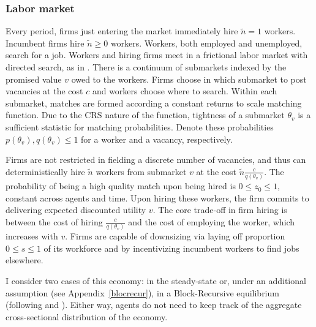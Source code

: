 \subsubsection*{Labor market}  %
Every period, firms just entering the market immediately hire $\tilde{n}=1$ workers. Incumbent firms hire $\tilde{n}\geq 0$ workers. Workers, both employed and unemployed, search for a job. Workers and hiring firms meet in a frictional labor market with directed search, as in \textcite{moen1997}. There is a continuum of submarkets indexed by the promised value $v$ owed to the workers. Firms choose in which submarket to post vacancies at the cost $c$ and workers choose where to search. Within each submarket, matches are formed according a constant returns to scale matching function. Due to the CRS nature of the function, tightness of a submarket $\theta_v$ is a sufficient statistic for matching probabilities. Denote these probabilities $p(\theta_v),q(\theta_v)\leq 1$ for a worker and a vacancy, respectively. 

Firms are not restricted in fielding a discrete number of vacancies, and thus can deterministically hire $\tilde{n}$ workers from submarket $v$ at the cost $\tilde{n}\frac{c}{q(\theta_v)}$. The probability of being a high quality match upon being hired is $0 \leq z_0\leq 1$, constant across agents and time. Upon hiring these workers, the firm commits to delivering expected discounted utility $v$. The core trade-off in firm hiring is between the cost of hiring $\frac{c}{q(\theta_v)}$ and the cost of employing the worker, which increases with $v$.
Firms are capable of downsizing via laying off proportion $0 \leq s\leq 1$ of its workforce and by incentivizing incumbent workers to find jobs elsewhere.

I consider two cases of this economy: in the steady-state or, under an additional assumption (see Appendix~\ref{blocrecur}), in a Block-Recursive equilibrium (following \textcite{menzio2011} and \textcite{schaal2017}). Either way, agents do not need to keep track of the aggregate cross-sectional distribution of the economy.
